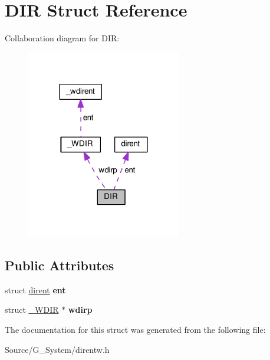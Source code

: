 \hypertarget{structDIR}{}\section{D\+IR Struct Reference}
\label{structDIR}


Collaboration diagram for D\+IR\+:
\nopagebreak
\begin{figure}[H]
\begin{center}
\leavevmode
\includegraphics[width=191pt]{structDIR__coll__graph}
\end{center}
\end{figure}
\subsection*{Public Attributes}
\begin{DoxyCompactItemize}
\item 
struct \hyperlink{structdirent}{dirent} {\bfseries ent}\hypertarget{structDIR_a59e9f5211cbb2f8e5b2807ccfdd2a7fc}{}\label{structDIR_a59e9f5211cbb2f8e5b2807ccfdd2a7fc}

\item 
struct \hyperlink{struct__WDIR}{\+\_\+\+W\+D\+IR} $\ast$ {\bfseries wdirp}\hypertarget{structDIR_a29362d4a3d7f809d0f5418b26cac5d41}{}\label{structDIR_a29362d4a3d7f809d0f5418b26cac5d41}

\end{DoxyCompactItemize}


The documentation for this struct was generated from the following file\+:\begin{DoxyCompactItemize}
\item 
Source/\+G\+\_\+\+System/direntw.\+h\end{DoxyCompactItemize}
